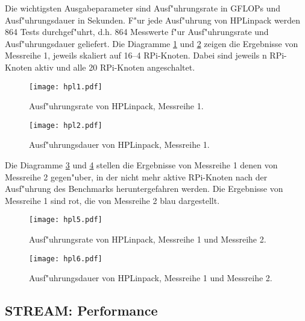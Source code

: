 Die wichtigsten Ausgabeparameter sind Ausf"uhrungsrate in GFLOPs und Ausf"uhrungsdauer in Sekunden. F"ur jede Ausf"uhrung von HPLinpack werden 864 Tests durchgef"uhrt, d.h. 864 Messwerte f"ur Ausf"uhrungsrate und Ausf"uhrungsdauer geliefert. Die Diagramme \ref{fig:hpl1} und \ref{fig:hpl2} zeigen die Ergebnisse von Messreihe 1, jeweils skaliert auf 16--4 RPi-Knoten. Dabei sind jeweils n RPi-Knoten aktiv und alle 20 RPi-Knoten angeschaltet.
\begin{figure}[htb]
  \centering
  \texttt{[image: hpl1.pdf]}\\ 
  \caption{Ausf"uhrungsrate von HPLinpack, Messreihe 1.}
  \label{fig:hpl1}		
\end{figure}
\begin{figure}[htb]
  \centering
  \texttt{[image: hpl2.pdf]}\\ 
  \caption{Ausf"uhrungsdauer von HPLinpack, Messreihe 1.}
  \label{fig:hpl2}		
\end{figure}

\newpage
\noindent
Die Diagramme \ref{fig:hpl5} und \ref{fig:hpl6} stellen die Ergebnisse von Messreihe 1 denen von Messreihe 2 gegen"uber, in der nicht mehr aktive RPi-Knoten nach der Ausf"uhrung des Benchmarks heruntergefahren werden. Die Ergebnisse von Messreihe 1 sind rot, die von Messreihe 2 blau dargestellt.
\begin{figure}[htb]
  \centering
  \texttt{[image: hpl5.pdf]}\\ 
  \caption{Ausf"uhrungsrate von HPLinpack, Messreihe 1 und Messreihe 2.}\label{fig:hpl5}
\end{figure}
\begin{figure}[htb]
  \centering
  \texttt{[image: hpl6.pdf]}\\ 
  \caption{Ausf"uhrungsdauer von HPLinpack, Messreihe 1 und Messreihe 2.}\label{fig:hpl6}
\end{figure}
\newpage 
\subsection{STREAM: Performance}\label{Ergebnisse-Stream}

